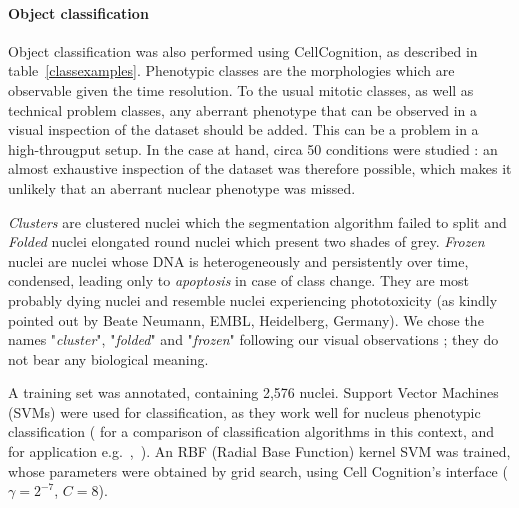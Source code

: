 \paragraph{Object classification}
Object classification was also performed using CellCognition, as described in table~\ref{classexamples}. Phenotypic classes are the morphologies which are observable given the time resolution. To the usual mitotic classes, as well as technical problem classes, any aberrant phenotype that can be observed in a visual inspection of the dataset should be added. This can be a problem in a high-througput setup. In the case at hand, circa 50 conditions were studied : an almost exhaustive inspection of the dataset was therefore possible, which makes it unlikely that an aberrant nuclear phenotype was missed.

\textit{Clusters} are clustered nuclei which the segmentation algorithm failed to split and \textit{Folded} nuclei elongated round nuclei which present two shades of grey. \textit{Frozen} nuclei are nuclei whose DNA is heterogeneously and persistently over time, condensed, leading only to \textit{apoptosis} in case of class change. They are most probably dying nuclei and resemble nuclei experiencing phototoxicity (as kindly pointed out by Beate Neumann, EMBL, Heidelberg, Germany). We chose the names "\textit{cluster}", "\textit{folded}" and "\textit{frozen}" following our visual observations ; they do not bear any biological meaning.

A training set was annotated, containing 2,576 nuclei. Support Vector Machines (SVMs) were used for classification, as they work well for nucleus phenotypic classification (\cite{kovalev} for a comparison of classification algorithms in this context, and for application e.g.~\cite{cellcognition},~\cite{Walter2010}). An RBF (Radial Base Function) kernel SVM was trained, whose parameters were obtained by grid search, using Cell Cognition's interface ($\gamma=2^{-7}$, $C=8$).%

